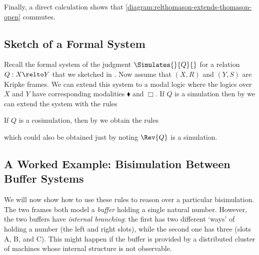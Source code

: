 \documentclass[10pt,a4paper]{article}
\begin{document}
Finally, a direct calculation shows that
\eqref{diagram:relthomason-extends-thomason-open} commutes.

\subsection{Sketch of a Formal System}

Recall the formal system of the judgment $\Simulates{}{Q}{}$ for a relation $Q :
X \relto Y$ that we sketched in . Now assume
that \((X, R)\) and \((Y, S)\) are Kripke frames. We can extend this system to a
modal logic where the logics over $X$ and $Y$ have corresponding modalities
$\blacklozenge$ and $\Box$. If $Q$ is a simulation then by
 we can extend the system with the rules
If $Q$ is a cosimulation, then by
 we
obtain the rules
which could also be obtained just by noting $\Rev{Q}$ is a
simulation.

\subsection{A Worked Example: Bisimulation Between Buffer Systems}

We will now show how to use these rules to reason over a particular
bisimulation. The two frames both model a \emph{buffer} holding a single natural
number. However, the two buffers have \emph{internal branching}: the first has
two different `ways' of holding a number (the left and right slots), while the
second one has three (slots A, B, and C). This might happen if the buffer is
provided by a distributed cluster of machines whose internal structure is not
observable.
\end{document}
